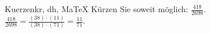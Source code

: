 \begin{MAufgabe}{Kuerzen}{kr, dh, MaTeX}
K\"urzen Sie soweit m\"oglich: $\frac{418}{2698}$.\\ 
\ifLsg\MLoesung
\quad $\frac{418}{2698}=\frac{(38)\cdot(11)}{(38)\cdot(71)}=\frac{11}{71}$.\else\relax\fi
 \end{MAufgabe}